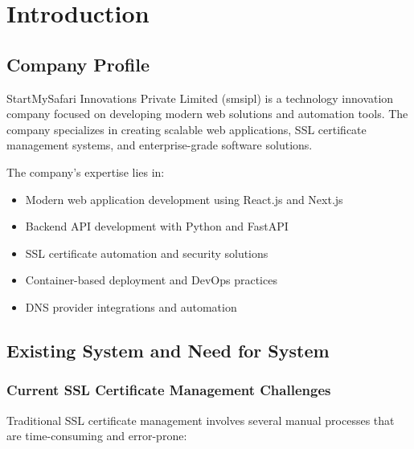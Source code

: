 
\chapter{Introduction}\doublespacing %

\label{Chapter1} %


\thispagestyle{empty}  %


\section{Company Profile}

StartMySafari Innovations Private Limited (smsipl) is a technology innovation company focused on developing modern web solutions and automation tools. The company specializes in creating scalable web applications, SSL certificate management systems, and enterprise-grade software solutions.

The company's expertise lies in:
\begin{itemize}
    \item Modern web application development using React.js and Next.js
    \item Backend API development with Python and FastAPI
    \item SSL certificate automation and security solutions
    \item Container-based deployment and DevOps practices
    \item DNS provider integrations and automation
\end{itemize}

\section{Existing System and Need for System}

\subsection{Current SSL Certificate Management Challenges}

Traditional SSL certificate management involves several manual processes that are time-consuming and error-prone:

